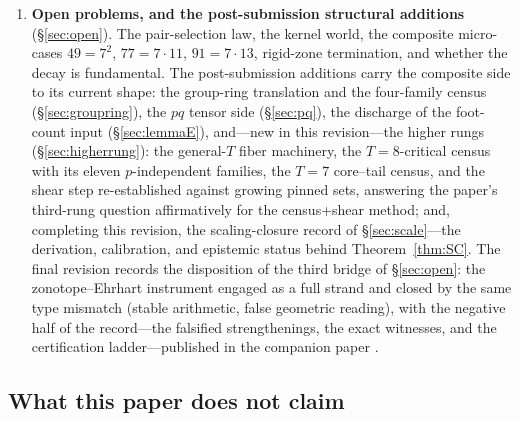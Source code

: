 \begin{enumerate}[leftmargin=1.6em,itemsep=2pt]
inequality Hq and the volume law H1g restated. The instrument is the
census in different notation; it consumes the hypotheses it was
commissioned to prove. That is the mechanism behind the type mismatch:
losslessness forbids generated decay, and the reformulation is bounded
by its own fidelity. (The closure theorem covers automata built on the
cascade's bijective drift---the lossless state space; instruments that
do not inherit the drift are outside its scope, as
\S\ref{sec:scale-status} records.)
\item \textbf{Open problems, and the post-submission structural
  additions} (\S\ref{sec:open}). The pair-selection law, the kernel world,
  the composite micro-cases $49=7^2$, $77=7\cdot 11$, $91=7\cdot 13$,
  rigid-zone termination, and whether the decay is fundamental. The
  post-submission additions carry the composite side to its current
  shape: the group-ring translation and the four-family census
  (\S\ref{sec:groupring}), the $pq$ tensor side (\S\ref{sec:pq}), the
  discharge of the foot-count input (\S\ref{sec:lemmaE}), and---new in
  this revision---the higher rungs (\S\ref{sec:higherrung}): the
  general-$T$ fiber machinery, the $T=8$-critical census with its eleven
  $p$-independent families, the $T=7$ core--tail census, and the shear
  step re-established against growing pinned sets, answering the paper's
  third-rung question affirmatively for the census+shear method; and,
  completing this revision, the scaling-closure record of
  \S\ref{sec:scale}---the derivation, calibration, and epistemic status
  behind Theorem~\ref{thm:SC}. The final revision records the disposition
  of the third bridge of \S\ref{sec:open}: the zonotope--Ehrhart
  instrument engaged as a full strand and closed by the same type
  mismatch (stable arithmetic, false geometric reading), with the
  negative half of the record---the falsified strengthenings, the exact
  witnesses, and the certification ladder---published in the companion
  paper \cite{companion-paper}.
\end{enumerate}

\subsection{What this paper does not claim}

